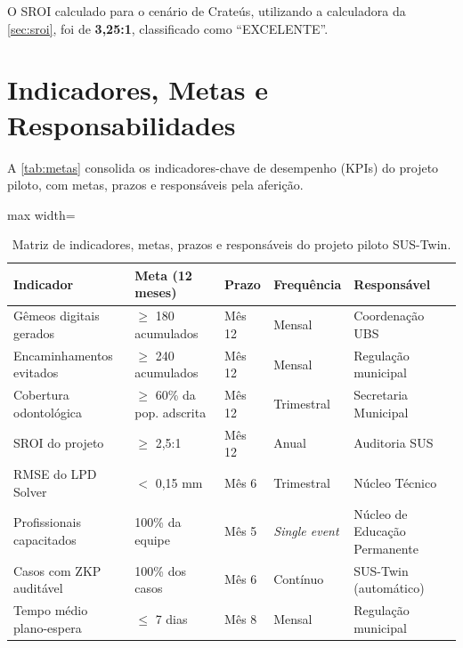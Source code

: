O SROI calculado para o cenário de Crateús, utilizando a calculadora
da \autoref{sec:sroi}, foi de \textbf{3,25:1}, classificado como
``EXCELENTE''.

\section{Indicadores, Metas e Responsabilidades}
\label{sec:indicadores-metas}

A \autoref{tab:metas} consolida os indicadores-chave de desempenho
(KPIs) do projeto piloto, com metas, prazos e responsáveis pela
aferição.

\begin{table}[htbp]
\centering
\caption{Matriz de indicadores, metas, prazos e responsáveis do projeto
         piloto SUS-Twin.}
\label{tab:metas}
\begin{adjustbox}{max width=\textwidth}
\begin{tabular}{lp{3.5cm}p{2.5cm}p{2.5cm}p{3.5cm}}
\toprule
\textbf{Indicador} & \textbf{Meta (12 meses)}
& \textbf{Prazo} & \textbf{Frequência}
& \textbf{Responsável} \\
\midrule
Gêmeos digitais gerados &
$\ge$ 180 acumulados
& Mês 12 & Mensal &
Coordenação UBS \\
Encaminhamentos evitados &
$\ge$ 240 acumulados
& Mês 12 & Mensal &
Regulação municipal \\
Cobertura odontológica &
$\ge$ 60\% da pop. adscrita
& Mês 12 & Trimestral &
Secretaria Municipal \\
SROI do projeto &
$\ge$ 2,5:1
& Mês 12 & Anual &
Auditoria SUS \\
RMSE do LPD Solver &
$<$ 0,15 mm
& Mês 6 & Trimestral &
Núcleo Técnico \\
Profissionais capacitados &
100\% da equipe
& Mês 5 & \textit{Single event} &
Núcleo de Educação Permanente \\
Casos com ZKP auditável &
100\% dos casos
& Mês 6 & Contínuo &
SUS-Twin (automático) \\
Tempo médio plano-espera &
$\le$ 7 dias
& Mês 8 & Mensal &
Regulação municipal \\
\bottomrule
\end{tabular}
\end{adjustbox}
\end{table}

